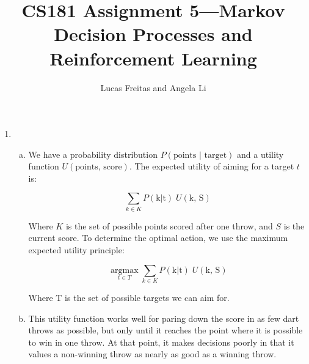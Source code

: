 \documentclass{article}
\title{CS181 Assignment 5---Markov Decision Processes and Reinforcement Learning}
\author{Lucas Freitas and Angela Li}
\begin{document}
\maketitle
    
    \begin{enumerate}
        \item
            \begin{enumerate}[(a)]
                \item We have a probability distribution $P(\text{points } | \text{ target})$ and a utility function $U(\text{points, score})$. The expected utility of aiming for a target $t$ is:

                $$\sum_{k \in K} P(\text{k} | \text{t}) \; U(\text{k, S})$$

                Where $K$ is the set of possible points scored after one throw, and $S$ is the current score. To determine the optimal action, we use the maximum expected utility principle:

                $$\underset{t \in T}{\operatorname{argmax}} \sum_{k \in K} P(\text{k} | \text{t}) \; U(\text{k, S})$$

                Where T is the set of possible targets we can aim for.

                \item This utility function works well for paring down the score in as few dart throws as possible, but only until it reaches the point where it is possible to win in one throw. At that point, it makes decisions poorly in that it values a non-winning throw as nearly as good as a winning throw. \\


\end{enumerate}
\end{enumerate}
\end{document}
